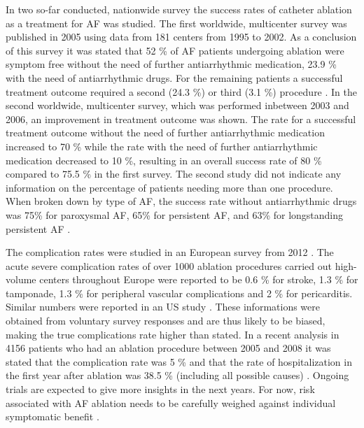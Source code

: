 \documentclass[type=dr, dr=rernat, accentcolor=tud7b,colorbacktitle, bigchapter, openright, twoside, 12pt ]{tudthesis}
\begin{document}
In two so-far conducted, nationwide survey the success rates of catheter ablation as a treatment 
for AF was studied. The first worldwide, multicenter survey was published in 2005 using data from 181 centers from 1995 to 2002. 
As a conclusion of this survey it was stated that 52 \% of AF patients undergoing ablation were symptom free without the need of further 
antiarrhythmic medication, 23.9 \% with the need of antiarrhythmic drugs. For the remaining patients a successful treatment outcome required 
a second (24.3 \%) or third (3.1 \%) procedure \cite{Cap05}. In the second worldwide, multicenter survey, which was performed inbetween 2003 
and 2006, an improvement in treatment outcome was shown. The rate for a successful treatment outcome without the need of further antiarrhythmic 
medication increased to 70 \% while the rate with the need of further antiarrhythmic medication decreased to 10 \%, resulting in an overall 
success rate of 80 \% compared to 75.5 \% in the first survey. The second study did not indicate any information on the percentage of patients 
needing more than one procedure. When broken down by type of AF, the success rate without antiarrhythmic drugs was 75\% for paroxysmal AF, 
65\% for persistent AF, and 63\% for longstanding persistent AF \cite{Cap10} \cite{Sto}.\newline

The complication rates were studied in an European survey from 2012 \cite{Arb12}. The acute severe complication rates of over 1000 ablation 
procedures carried out high-volume centers throughout Europe were reported to be 0.6 \% for stroke, 1.3 \% for tamponade, 1.3 \% for 
peripheral vascular complications and 2 \% for pericarditis. Similar numbers were reported in an US study \cite{Hoy11} \cite{Cap10}. 
These informations were obtained from voluntary survey responses and are thus likely to be biased, making the true complications rate 
higher than stated. In a recent analysis in 4156 patients who had an ablation procedure between 2005 and 2008 it was stated that the 
complication rate was 5 \% and that the rate of hospitalization in the first year after ablation was 38.5 \% (including all possible causes) 
\cite{Sha12}. Ongoing trials are expected to give more insights in the next years. For now, risk associated with AF ablation needs to be carefully 
weighed against individual symptomatic benefit \cite{ESC12}. 
\end{document}
